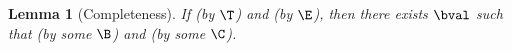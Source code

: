 \documentclass[12pt]{article}
\newcounter{statementcounter}
\newtheorem{lemma}[statementcounter]{Lemma}
\newtheorem{theorem}[statementcounter]{Theorem}
\newenvironment{proof}[1][Proof]{
\paragraph{#1}
}{
\begin{flushright}
$\blacksquare$
\end{flushright}
}
\begin{document}
\begin{lemma}[Completeness]
\label{lem:completeness-hb}
If \trahb{\hbctx}{\benv}{\hexp}{\bexp} (by $\T$) and \hev{\hexp}{\hval} (by $\E$), then there exists $\bval$ such that \bev{\benv}{\bexp}{\bval} (by some $\B$) and \corhb{\hbctx}{\bval}{\hval} (by some $\C$).
\end{lemma}










\end{document}
